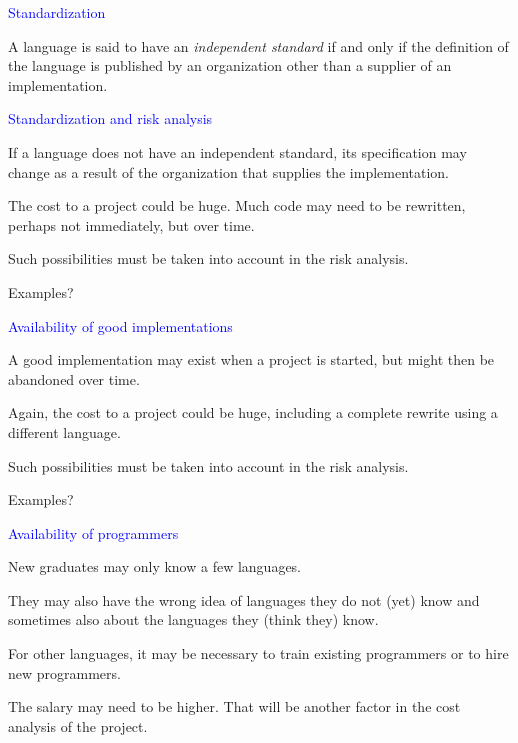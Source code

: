 \documentclass{slides}
\newcommand{\ti}[1]{\begin{center}\Large{\textcolor{blue}{#1}}\end{center}}
\begin{document}
\begin{slide}\ti{Standardization}

A language is said to have an \emph{independent standard} if and only
if the definition of the language is published by an organization
other than a supplier of an implementation.

\vfill\end{slide}
\begin{slide}\ti{Standardization and risk analysis}

If a language does not have an independent standard, its specification
may change as a result of the organization that supplies the
implementation.

The cost to a project could be huge.  Much code may need to be
rewritten, perhaps not immediately, but over time.

Such possibilities must be taken into account in the risk analysis.

Examples?

\vfill\end{slide}
\begin{slide}\ti{Availability of good implementations}

A good implementation may exist when a project is started, but might
then be abandoned over time.

Again, the cost to a project could be huge, including a complete
rewrite using a different language.

Such possibilities must be taken into account in the risk analysis.

Examples?

\vfill\end{slide}
\begin{slide}\ti{Availability of programmers}

New graduates may only know a few languages.

They may also have the wrong idea of languages they do not (yet) know
and sometimes also about the languages they (think they) know.

For other languages, it may be necessary to train existing programmers
or to hire new programmers.

The salary may need to be higher.  That will be another factor in the
cost analysis of the project.

\vfill\end{slide}
\end{document}
